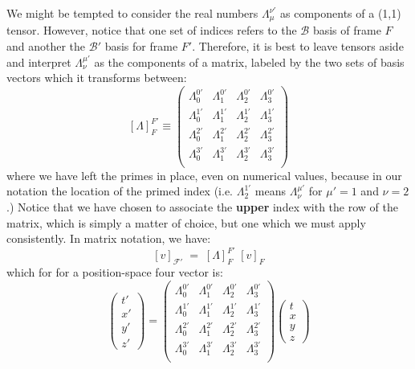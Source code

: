 \documentclass[12pt]{article}
\begin{document}
\noindent
We might be tempted to consider the real numbers
$\Lambda^{\nu'}_{\mu}$ as components of a (1,1) tensor.  However,
notice that one set of indices refers to the $\mathcal{B}$ basis of frame $F$ and
another the $\mathcal{B'}$ basis for frame $F'$.  Therefore, it is best to leave tensors
aside and interpret $\Lambda^{\mu'}_{\nu}$ as the components of a
matrix, labeled by the two sets of basis vectors which it transforms
between:
$$[\Lambda]^{ F'}_F
\equiv \begin{pmatrix}
  \Lambda^{0'}_0 &\Lambda^{0'}_1 &\Lambda^{0'}_2 &\Lambda^{0'}_3 \\[3pt]
  \Lambda^{1'}_0 &\Lambda^{1'}_1 &\Lambda^{1'}_2 &\Lambda^{1'}_3 \\[3pt]
  \Lambda^{2'}_0 &\Lambda^{2'}_1 &\Lambda^{2'}_2 &\Lambda^{2'}_3 \\[3pt]
  \Lambda^{3'}_0 &\Lambda^{3'}_1 &\Lambda^{3'}_2 &\Lambda^{3'}_3 \\
\end{pmatrix}$$
where we have left the primes in place, even on numerical values,
because in our notation the location of the primed index
(i.e. $\Lambda^{1'}_{2}$ means $\Lambda^{\mu'}_{\nu}$ for $\mu'=1$ and
$\nu=2$.)  Notice that we have chosen to associate the {\bf upper}
index with the row of the matrix, which is simply a matter of choice,
but one which we must apply consistently.  In matrix notation, we
have:
$$[v]_\mathcal{F'} \; = \; [\Lambda]^{F'}_F \; [v]_F$$
which for for a position-space four vector is:
$$\begin{pmatrix} t' \\ x' \\ y' \\ z' \end{pmatrix} =
\begin{pmatrix}
  \Lambda^{0'}_0 &\Lambda^{0'}_1 &\Lambda^{0'}_2 &\Lambda^{0'}_3 \\[3pt]
  \Lambda^{1'}_0 &\Lambda^{1'}_1 &\Lambda^{1'}_2 &\Lambda^{1'}_3 \\[3pt]
  \Lambda^{2'}_0 &\Lambda^{2'}_1 &\Lambda^{2'}_2 &\Lambda^{2'}_3 \\[3pt]
  \Lambda^{3'}_0 &\Lambda^{3'}_1 &\Lambda^{3'}_2 &\Lambda^{3'}_3 \\
\end{pmatrix}
\begin{pmatrix} t \\ x \\ y \\ z \end{pmatrix}$$
\end{document}
